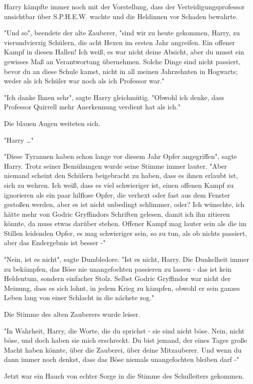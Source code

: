 {Harry kämpfte immer noch mit der Vorstellung, dass der Verteidigungsprofessor unsichtbar über S.P.H.E.W. wachte und die Heldinnen vor Schaden bewahrte.

"Und so", beendete der alte Zauberer, "sind wir zu heute gekommen, Harry, zu vierundvierzig Schülern, die acht Hexen im ersten Jahr angreifen. Ein offener Kampf in diesen Hallen! Ich weiß, es war nicht deine Absicht, aber du musst ein gewisses Maß an Verantwortung übernehmen. Solche Dinge sind nicht passiert, bevor du an diese Schule kamst, nicht in all meinen Jahrzehnten in Hogwarts; weder als ich Schüler war noch als ich Professor war."

"Ich danke Ihnen sehr", sagte Harry gleichmütig. "Obwohl ich denke, dass Professor Quirrell mehr Anerkennung verdient hat als ich."

Die blauen Augen weiteten sich.

"Harry …"

"Diese Tyrannen haben schon lange vor diesem Jahr Opfer angegriffen", sagte Harry. Trotz seiner Bemühungen wurde seine Stimme immer lauter. "Aber niemand scheint den Schülern beigebracht zu haben, dass es ihnen erlaubt ist, sich zu wehren. Ich weiß, dass es viel schwieriger ist, einen offenen Kampf zu ignorieren als ein paar hilflose Opfer, die verhext oder fast aus dem Fenster gestoßen werden, aber es ist nicht unbedingt schlimmer, oder? Ich wünschte, ich hätte mehr von Godric Gryffindors Schriften gelesen, damit ich ihn zitieren könnte, da muss etwas darüber stehen. Offener Kampf mag lauter sein als die im Stillen leidenden Opfer, es mag schwieriger sein, so zu tun, als ob nichts passiert, aber das Endergebnis ist besser -"

"Nein, ist es nicht", sagte Dumbledore. "Ist es nicht, Harry. Die Dunkelheit immer zu bekämpfen, das Böse nie unangefochten passieren zu lassen - das ist kein Heldentum, sondern einfacher Stolz. Selbst Godric Gryffindor war nicht der Meinung, dass es sich lohnt, in jedem Krieg zu kämpfen, obwohl er sein ganzes Leben lang von einer Schlacht in die nächste zog."

Die Stimme des alten Zauberers wurde leiser.

"In Wahrheit, Harry, die Worte, die du sprichst - sie sind nicht böse. Nein, nicht böse, und doch haben sie mich erschreckt. Du bist jemand, der eines Tages große Macht haben könnte, über die Zauberei, über deine Mitzauberer. Und wenn du dann immer noch denkst, dass das Böse niemals unangefochten bleiben darf -"

Jetzt war ein Hauch von echter Sorge in die Stimme des Schulleiters gekommen.

}
